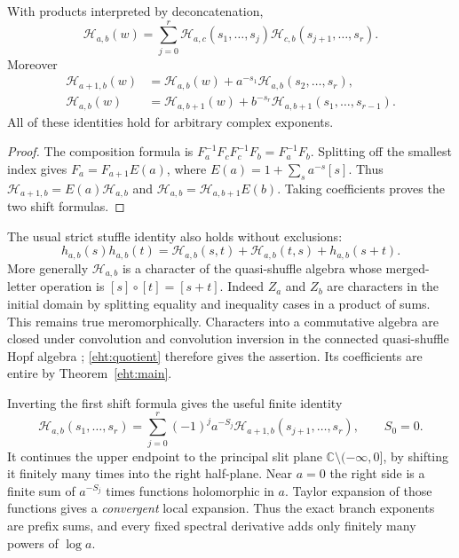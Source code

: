 \begin{corollary}\label{eht:transport}
With products interpreted by deconcatenation,
\begin{equation}\label{eht:cocycle}
 \boxed{\mathcal H_{a,b}(w)=
 \sum_{j=0}^r\mathcal H_{a,c}(s_1,\ldots,s_j)
                  \mathcal H_{c,b}(s_{j+1},\ldots,s_r).}
\end{equation}
Moreover
\begin{align}
 \mathcal H_{a+1,b}(w)
   &=\mathcal H_{a,b}(w)+a^{-s_1}
                              \mathcal H_{a,b}(s_2,\ldots,s_r),
       \label{eht:upper-shift}\\
 \mathcal H_{a,b}(w)
   &=\mathcal H_{a,b+1}(w)+b^{-s_r}
                              \mathcal H_{a,b+1}(s_1,\ldots,s_{r-1}).
       \label{eht:lower-shift}
\end{align}
All of these identities hold for arbitrary complex exponents.
\end{corollary}

\begin{proof}
The composition formula is
$F_a^{-1}F_cF_c^{-1}F_b=F_a^{-1}F_b$.
Splitting off the smallest index gives
$F_a=F_{a+1}E(a)$, where $E(a)=1+\sum_s a^{-s}[s]$.
Thus $\mathcal H_{a+1,b}=E(a)\mathcal H_{a,b}$ and
$\mathcal H_{a,b}=\mathcal H_{a,b+1}E(b)$.  Taking coefficients proves
the two shift formulas.
\end{proof}

The usual strict stuffle identity also holds without exclusions:
\begin{equation}\label{eht:stuffle-two}
 h_{a,b}(s)h_{a,b}(t)=
 \mathcal H_{a,b}(s,t)+\mathcal H_{a,b}(t,s)+h_{a,b}(s+t).
\end{equation}
More generally $\mathcal H_{a,b}$ is a character of the quasi-shuffle
algebra whose merged-letter operation is $[s]\circ[t]=[s+t]$.  Indeed $Z_a$ and
$Z_b$ are characters in the initial domain by splitting equality and
inequality cases in a product of sums.  This remains true meromorphically.
Characters into a commutative algebra are closed under convolution and
convolution inversion in the connected quasi-shuffle Hopf algebra
\cite{eht:Hoffman}; \eqref{eht:quotient} therefore gives the assertion.
Its coefficients are entire by Theorem~\ref{eht:main}.

Inverting the first shift formula gives the useful finite identity
\begin{equation}\label{eht:inverse-shift}
 \boxed{\mathcal H_{a,b}(s_1,\ldots,s_r)=
  \sum_{j=0}^r(-1)^j a^{-S_j}
                  \mathcal H_{a+1,b}(s_{j+1},\ldots,s_r),}
 \qquad S_0=0.
\end{equation}
It continues the upper endpoint to the principal slit plane
$\mathbb C\setminus(-\infty,0]$, by shifting it finitely many times into
the right half-plane.  Near $a=0$ the right side is a finite sum of
$a^{-S_j}$ times functions holomorphic in $a$.  Taylor expansion of those
functions gives a \emph{convergent} local expansion.  Thus the exact
branch exponents are prefix sums, and every fixed spectral derivative
adds only finitely many powers of $\log a$.

